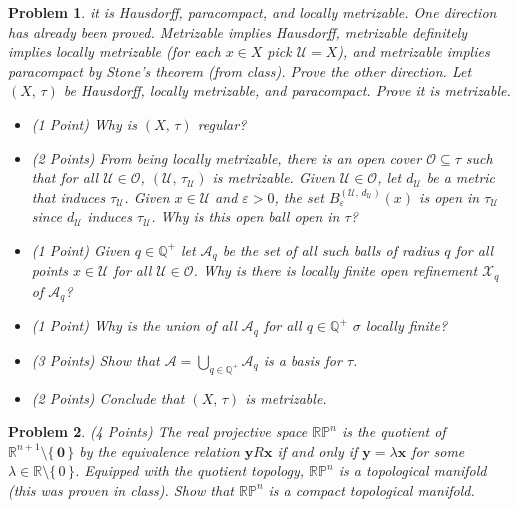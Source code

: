 \documentclass{article}
\theoremstyle{normal}
\newtheorem{problem}{Problem}
\begin{document}
\begin{problem}
        it is Hausdorff, paracompact, and locally metrizable. One direction has
        already been proved. Metrizable implies Hausdorff, metrizable definitely
        implies locally metrizable (for each $x\in{X}$ pick $\mathcal{U}=X$),
        and metrizable implies paracompact by Stone's theorem (from class).
        Prove the other direction. Let $(X,\,\tau)$ be Hausdorff, locally
        metrizable, and paracompact. Prove it is metrizable.
        \begin{itemize}
            \item (1 Point) Why is $(X,\,\tau)$ regular?
            \item (2 Points) From being locally metrizable, there is an open
                cover $\mathcal{O}\subseteq\tau$ such that for all
                $\mathcal{U}\in\mathcal{O}$,
                $(\mathcal{U},\,\tau_{\mathcal{U}})$ is metrizable. Given
                $\mathcal{U}\in\mathcal{O}$, let $d_{\mathcal{U}}$ be a metric
                that induces $\tau_{\mathcal{U}}$. Given $x\in\mathcal{U}$
                and $\varepsilon>0$, the set
                $B_{\varepsilon}^{(\mathcal{U},\,d_{\mathcal{U}})}(x)$ is open
                in $\tau_{\mathcal{U}}$ since $d_{\mathcal{U}}$ induces
                $\tau_{\mathcal{U}}$. Why is this open ball open in $\tau$?
            \item (1 Point) Given $q\in\mathbb{Q}^{+}$ let
                $\mathcal{A}_{q}$ be the set of all such balls of radius $q$
                for all points $x\in\mathcal{U}$ for all
                $\mathcal{U}\in\mathcal{O}$. Why is there is locally finite
                open refinement $\mathcal{X}_{q}$ of $\mathcal{A}_{q}$?
            \item (1 Point) Why is the union of all $\mathcal{A}_{q}$ for all
                $q\in\mathbb{Q}^{+}$ $\sigma$ locally finite?
            \item (3 Points) Show that
                $\mathcal{A}=\bigcup_{q\in\mathbb{Q}^{+}}\mathcal{A}_{q}$ is a
                basis for $\tau$.
            \item (2 Points) Conclude that $(X,\,\tau)$ is metrizable.
        \end{itemize}
    \end{problem}
    \begin{problem}
        (4 Points)
        The real projective space $\mathbb{RP}^{n}$ is the quotient of
        $\mathbb{R}^{n+1}\setminus\{\,\mathbf{0}\,\}$ by the equivalence
        relation $\mathbf{y}R\mathbf{x}$ if and only if
        $\mathbf{y}=\lambda\mathbf{x}$ for some
        $\lambda\in\mathbb{R}\setminus\{\,0\,\}$. Equipped with the quotient
        topology, $\mathbb{RP}^{n}$ is a topological manifold (this was proven
        in class). Show that $\mathbb{RP}^{n}$ is a compact
        topological manifold.
    \end{problem}
\end{document}
